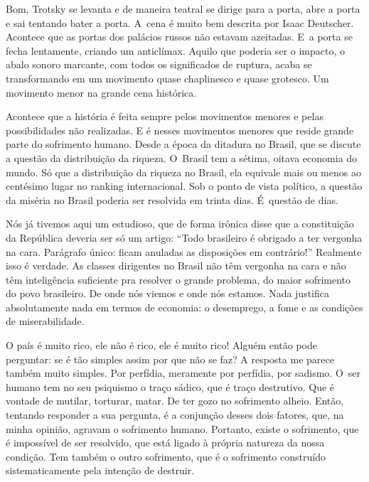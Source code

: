  

Bom, Trotsky se levanta e de maneira teatral se dirige para a porta,
abre a porta e sai tentando bater a porta. A~cena é muito bem descrita
por Isaac Deutscher. Acontece que as portas dos palácios russos não
estavam azeitadas. E~a porta se fecha lentamente, criando um anticlímax.
Aquilo que poderia ser o impacto, o abalo sonoro marcante, com todos os
significados de ruptura, acaba se transformando em um movimento quase
chaplinesco e quase grotesco. Um movimento menor na grande cena
histórica.

 

Acontece que a história é feita sempre pelos movimentos menores e pelas
possibilidades não realizadas. E é nesses movimentos menores que reside
grande parte do sofrimento humano. Desde a época da ditadura no Brasil,
que se discute a questão da distribuição da riqueza. O~Brasil tem a
sétima, oitava economia do mundo. Só que a distribuição da riqueza no
Brasil, ela equivale mais ou menos ao centésimo lugar no ranking
internacional. Sob o ponto de vista político, a questão da miséria no
Brasil poderia ser resolvida em trinta dias. É~questão de dias.

 

Nós já tivemos aqui um estudioso, que de forma irônica disse que a
constituição da República deveria ser só um artigo: ``Todo brasileiro é
obrigado a ter vergonha na cara. Parágrafo único: ficam anuladas as
disposições em contrário!'' Realmente isso é verdade. As classes
dirigentes no Brasil não têm vergonha na cara e não têm inteligência
suficiente pra resolver o grande problema, do maior sofrimento do povo
brasileiro. De onde nós viemos e onde nós estamos. Nada justifica
absolutamente nada em termos de economia: o desemprego, a fome e as
condições de miserabilidade.

 

O país é muito rico, ele não é rico, ele é muito rico! Alguém então pode
perguntar: se é tão simples assim por que não se faz? A resposta me
parece também muito simples. Por perfídia, meramente por perfídia, por
sadismo. O~ser humano tem no seu psiquismo o traço sádico, que é traço
destrutivo. Que é vontade de mutilar, torturar, matar. De ter gozo no
sofrimento alheio. Então, tentando responder a sua pergunta, é a
conjunção desses dois fatores, que, na minha opinião, agravam o sofrimento
humano. Portanto, existe o sofrimento, que é impossível de ser resolvido,
que está ligado à própria natureza da nossa condição. Tem também o outro
sofrimento, que é o sofrimento construído sistematicamente pela intenção
de destruir.

